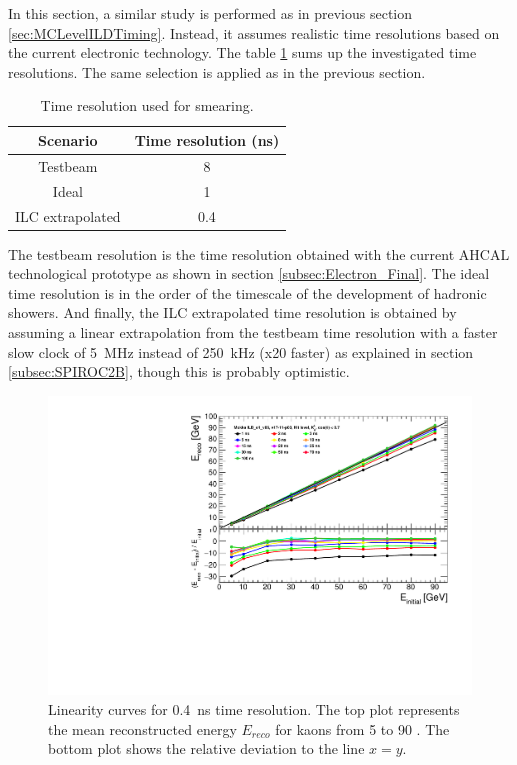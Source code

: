 In this section, a similar study is performed as in previous section \ref{sec:MCLevelILDTiming}. Instead, it assumes realistic time resolutions based on the current electronic technology. The table \ref{table:TimeReso} sums up the investigated time resolutions. The same selection is applied as in the previous section.


\begin{table}[htb!]
  \centering
  \caption{Time resolution used for smearing.} \label{table:TimeReso}
  \begin{tabular}{|c|c|}
    \hline
    Scenario & Time resolution (ns) \\
    \hline
    Testbeam & 8 \\
    Ideal & 1 \\
    ILC extrapolated & 0.4 \\
    \hline
  \end{tabular}
\end{table}

The testbeam resolution is the time resolution obtained with the current AHCAL technological prototype as shown in section \ref{subsec:Electron_Final}. The ideal time resolution is in the order of the timescale of the development of hadronic showers. And finally, the ILC extrapolated time resolution is obtained by assuming a linear extrapolation from the testbeam time resolution with a faster slow clock of \SI{5}{\mega\hertz} instead of \SI{250}{\kilo\hertz} (x20 faster) as explained in section \ref{subsec:SPIROC2B}, though this is probably optimistic.

\begin{figure}[htbp!]
  \centering
  \includegraphics[width=0.7\linewidth]{../Thesis_Plots/ILD/Smearing_0.4ns/Plots/Linearity_TimeCuts_Smearing1}
  \caption{Linearity curves for \SI{0.4}{\nano\second} time resolution. The top plot represents the mean reconstructed energy $E_{reco}$ for kaons from 5 to 90 \GeV. The bottom plot shows the relative deviation to the line $x=y$.} \label{fig:Lin0.4ns}
\end{figure}

